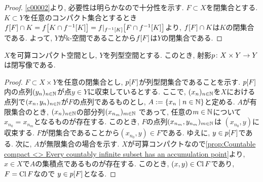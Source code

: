 \documentclass[uplatex, dvipdfmx, a4paper, 12pt, class=jsbook, crop=false]{standalone}
\begin{document}
\begin{proof}
	\cref{c00002}より, 必要性は明らかなので十分性を示す.
	$ F \subset X $を閉集合とする. $ K \subset Y $を任意のコンパクト集合とするとき
	$ \mapset{f}{F} \cap K = \mapset{f}{K \cap \mapinvset{f}{K}}
	= \mapset{f|_{\mapinvset{f}{K}}}{F \cap  \mapinvset{f}{K}} $より,
	$ \mapset{f}{F} \cap K $は$ K $の閉集合である.
	よって, $ Y $がk-空間であることから$ \mapset{f}{F} $は$ Y $の閉集合である.
\end{proof}

\begin{proposition}
	$ X $を可算コンパクト空間とし, $ Y $を列型空間とする. このとき, 射影$ p\colon X \times Y\to Y $は閉写像である.
\end{proposition}

\begin{proof}
	$ F \subset X \times Y $を任意の閉集合とし, $ \mapset{p}{F} $が列型閉集合であることを示す.
	$ \mapset{p}{F} $内の点列$ (y_n)_{n \in \mathbb{N}} $が点$ y \in Y $に収束しているとする.
	ここで, $ (x_n)_{n \in \mathbb{N}} $を$ X $における点列で$ (x_n, y_n)_{n \in \mathbb{N}}  $が$ F $の点列であるものとし,
	$ A \defeq \setcomp{x_n}{n \in \N} $と定める.
	$ A $が有限集合のとき, $ (x_n)_{n \in \mathbb{N}} $の部分列$ (x_{n_m})_{m \in \mathbb{N}} $
	であって, 任意の$ m \in \mathbb{N} $について$ x_{n_0} = x_{n_m} $となるものが存在する.
	このとき, $ F $の点列$ (x_{n_m}, y_{n_m})_{m \in \mathbb{N}} $は
	$ (x_{n_0}, y) $に収束する.
	$ F $が閉集合であることから$ (x_{n_0}, y) \in F $である.
	ゆえに, $ y \in \mapset{p}{F} $である.
	次に, $ A $が無限集合の場合を示す.
	$ X $が可算コンパクトなので\cref{prop:Countable compact <> Every countably infinite subset has an accumulation point}より,
	$ x \in X $で$ A $の集積点であるものが存在する.
	このとき, $ (x, y) \in \mathop{\mathrm{Cl}}\nolimits F $であり, $ F = \mathop{\mathrm{Cl}}\nolimits F $なので
	$ y \in \mapset{p}{F} $となる.
\end{proof}
\end{document}
